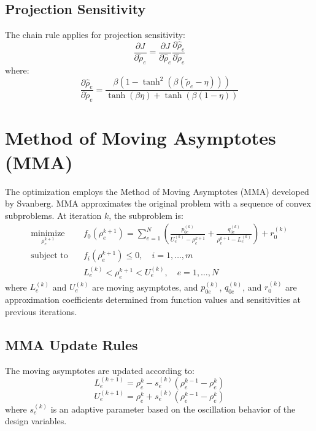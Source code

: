 \documentclass[11pt]{report}
\newcommand{\rhoe}{\rho_e}
\newcommand{\obj}{J}
\begin{document}
\subsection{Projection Sensitivity}
The chain rule applies for projection sensitivity:
\begin{equation}
\frac{\partial \obj}{\partial \tilde{\rho}_e} = \frac{\partial \obj}{\partial \hat{\rho}_e} \frac{\partial \hat{\rho}_e}{\partial \tilde{\rho}_e}
\end{equation}
where:
\begin{equation}
\frac{\partial \hat{\rho}_e}{\partial \tilde{\rho}_e} = \frac{\beta (1 - \tanh^2(\beta (\tilde{\rho}_e - \eta)))}{\tanh(\beta \eta) + \tanh(\beta (1 - \eta))}
\end{equation}

\section{Method of Moving Asymptotes (MMA)}
The optimization employs the Method of Moving Asymptotes (MMA) developed by Svanberg. MMA approximates the original problem with a sequence of convex subproblems. At iteration $k$, the subproblem is:
\begin{align}
\underset{\rhoe^{k+1}}{\text{minimize}} \quad & f_0(\rhoe^{k+1}) = \sum_{e=1}^{N} \left( \frac{p_{0e}^{(k)}}{U_e^{(k)} - \rhoe^{k+1}} + \frac{q_{0e}^{(k)}}{\rhoe^{k+1} - L_e^{(k)}} \right) + r_0^{(k)} \\
\text{subject to} \quad & f_i(\rhoe^{k+1}) \leq 0, \quad i = 1, \ldots, m \\
& L_e^{(k)} < \rhoe^{k+1} < U_e^{(k)}, \quad e = 1, \ldots, N
\end{align}
where $L_e^{(k)}$ and $U_e^{(k)}$ are moving asymptotes, and $p_{0e}^{(k)}$, $q_{0e}^{(k)}$, and $r_0^{(k)}$ are approximation coefficients determined from function values and sensitivities at previous iterations.

\subsection{MMA Update Rules}
The moving asymptotes are updated according to:
\begin{equation}
L_e^{(k+1)} = \rhoe^{k} - s_e^{(k)} (\rhoe^{k-1} - \rhoe^{k})
\end{equation}
\begin{equation}
U_e^{(k+1)} = \rhoe^{k} + s_e^{(k)} (\rhoe^{k-1} - \rhoe^{k})
\end{equation}
where $s_e^{(k)}$ is an adaptive parameter based on the oscillation behavior of the design variables.
\end{document}
